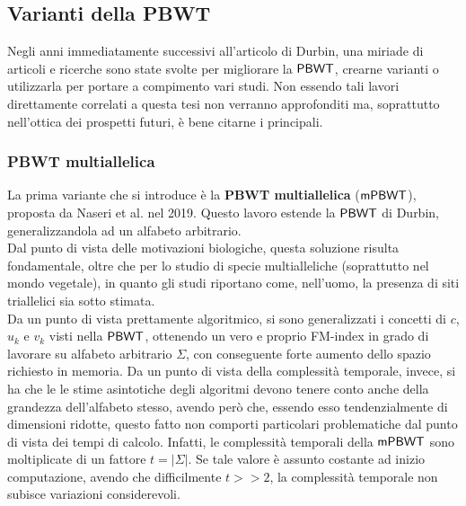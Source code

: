 \subsection{Varianti della PBWT}
Negli anni immediatamente successivi all'articolo di Durbin, una miriade di
articoli e ricerche sono state svolte per migliorare la $\mbox{\rm {\sf PBWT}}$, crearne
varianti o utilizzarla per portare a compimento vari studi. Non essendo tali
lavori direttamente correlati a questa tesi non 
verranno approfonditi ma, soprattutto nell'ottica dei prospetti futuri, è bene
citarne i principali.
\subsubsection{PBWT multiallelica}
La prima variante che si introduce è la \textbf{PBWT multiallelica} ($\mbox{\rm {\sf mPBWT}}$),
proposta da Naseri et al. \cite{mpbwt} nel 2019. Questo 
lavoro estende la $\mbox{\rm {\sf PBWT}}$ di Durbin, generalizzandola ad un alfabeto
arbitrario. \\
Dal punto di vista delle motivazioni biologiche, questa soluzione risulta
fondamentale, oltre che per lo studio di specie multialleliche (soprattutto nel
mondo vegetale), in quanto gli studi riportano come, nell'uomo, la presenza di
siti triallelici sia sotto stimata. \\
Da un punto di vista prettamente algoritmico, si sono generalizzati i concetti di
$c$, $u_k$ e $v_k$ visti nella $\mbox{\rm {\sf PBWT}}$, ottenendo un vero e proprio
FM-index in grado di lavorare su alfabeto arbitrario $\Sigma$, con
conseguente forte aumento dello spazio richiesto in memoria. Da un punto di
vista della complessità temporale, invece, si ha che le le stime asintotiche
degli 
algoritmi devono tenere conto anche della grandezza dell'alfabeto stesso, avendo
però che, essendo esso tendenzialmente di dimensioni ridotte, questo fatto non
comporti particolari problematiche dal punto di vista dei tempi di
calcolo. Infatti, le complessità temporali della $\mbox{\rm {\sf mPBWT}}$ sono moltiplicate
di un fattore $t=\left|\Sigma\right|$. Se tale valore è assunto
costante ad inizio computazione, avendo che difficilmente $t>>2$, la
complessità temporale non subisce variazioni considerevoli.
